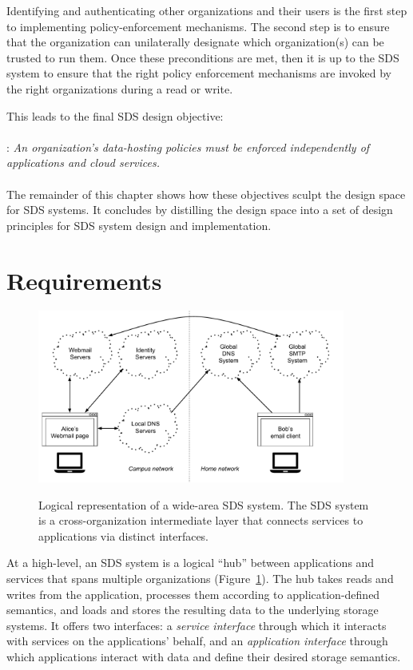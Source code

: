 Identifying and authenticating other organizations and their users
is the first step to implementing policy-enforcement mechanisms.
The second step is to ensure that the organization can unilaterally
designate which organization(s) can be trusted to run them.
Once these preconditions are met, then it is up to the SDS system to ensure that the right
policy enforcement mechanisms are invoked by the right organizations during a read or write.

This leads to the final SDS design objective:
\\
\\
: \emph{An organization's data-hosting policies
must be enforced independently of applications and cloud services.}
\\
\\
The remainder of this chapter shows how these objectives sculpt the design space
for SDS systems.  It concludes by distilling the design space into a set of
design principles for SDS system design and implementation.

\section{Requirements}

\begin{figure}[h]
   \caption{Logical representation of a wide-area SDS system.  The SDS system
   is a cross-organization intermediate layer that connects services to
   applications via distinct interfaces.}
   \centering
   \includegraphics[width=0.9\textwidth,page=2]{figures/dissertation-figures}
   \label{fig:chap2-sds-overview}
\end{figure}

At a high-level, an SDS system is a logical ``hub'' between applications and
services that spans multiple organizations (Figure~\ref{fig:chap2-sds-overview}). 
The hub takes reads and writes from the application, processes them
according to application-defined semantics, and loads and stores the resulting
data to the underlying storage systems.
It offers two interfaces:  a \emph{service interface} through which it interacts with
services on the applications' behalf, and an \emph{application interface} through
which applications interact with data and define their desired storage
semantics.

